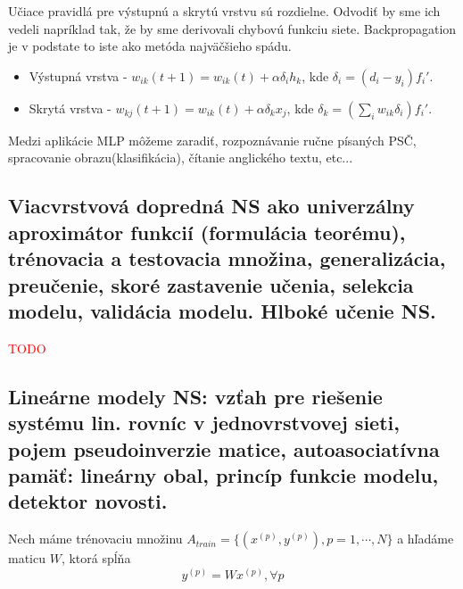 \documentclass{article}
\numberwithin{equation}{section} %
\begin{document}
Učiace pravidlá pre výstupnú a skrytú vrstvu sú rozdielne. Odvodiť by sme ich vedeli napríklad tak, že by sme derivovali chybovú funkciu siete. Backpropagation je v podstate to iste ako metóda najväčšieho spádu.
\begin{itemize}
\item Výstupná vrstva - $ w_{ik}(t+1) = w_{ik}(t) + \alpha\delta_ih_k $, kde $\delta_i = (d_i - y_i)f_i'$.
\item Skrytá vrstva - $ w_{kj}(t+1) = w_{ik}(t) + \alpha\delta_kx_j $, kde $\delta_k = (\sum_iw_{ik}\delta_i)f_i'$.
\end{itemize}
Medzi aplikácie MLP môžeme zaradiť, rozpoznávanie ručne písaných PSČ, spracovanie obrazu(klasifikácia), čítanie anglického textu, etc...

\subsection{Viacvrstvová dopredná NS ako univerzálny aproximátor funkcií (formulácia teorému), trénovacia a testovacia množina, generalizácia, preučenie, skoré zastavenie učenia, selekcia modelu, validácia modelu. Hlboké učenie NS.}
\textcolor{red}{TODO}


\subsection{Lineárne modely NS: vzťah pre riešenie systému lin. rovníc v jednovrstvovej sieti, pojem pseudoinverzie matice, autoasociatívna pamäť: lineárny obal, princíp funkcie modelu, detektor novosti.}
Nech máme trénovaciu množinu $A_{train} = \{ (x^{(p)}, y^{(p)}), p=1,\cdots,N \}$ a hľadáme maticu $W$, ktorá spĺňa $$y^{(p)} = Wx^{(p)}, \forall p$$
\end{document}
